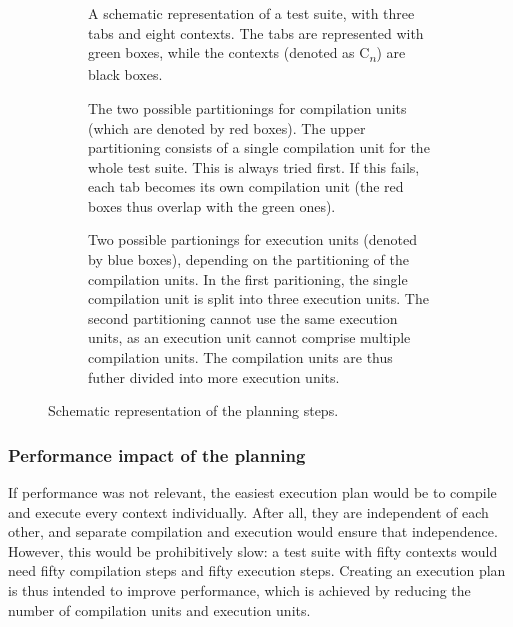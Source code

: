 \documentclass[../main]{subfiles}
\begin{document}
\begin{figure}
    \begin{subfigure}{\textwidth}
        \centering
        
        \caption{
            A schematic representation of a test suite, with three tabs and eight contexts.
            The tabs are represented with green boxes, while the contexts (denoted as C\textsubscript{$n$}) are black boxes.
        }
        \label{fig:planning-suite}
    \end{subfigure}
    \par\bigskip
    \begin{subfigure}{\textwidth}
        \centering
        
        \caption{
            The two possible partitionings for compilation units (which are denoted by red boxes).
            The upper partitioning consists of a single compilation unit for the whole test suite.
            This is always tried first.
            If this fails, each tab becomes its own compilation unit (the red boxes thus overlap with the green ones).
        }
        \label{fig:planning-compilation}
    \end{subfigure}
    \par\bigskip
    \begin{subfigure}{\textwidth}
        \centering
        
        \caption{
            Two possible partionings for execution units (denoted by blue boxes), depending on the partitioning of the compilation units.
            In the first paritioning, the single compilation unit is split into three execution units.
            The second partitioning cannot use the same execution units, as an execution unit cannot comprise multiple compilation units.
            The compilation units are thus futher divided into more execution units.
        }
        \label{fig:planning-execution}
    \end{subfigure}
    \caption{Schematic representation of the planning steps.}
\end{figure}

\subsubsection{Performance impact of the planning}

If performance was not relevant, the easiest execution plan would be to compile and execute every context individually.
After all, they are independent of each other, and separate compilation and execution would ensure that independence.
However, this would be prohibitively slow: a test suite with fifty contexts would need fifty compilation steps and fifty execution steps.
Creating an execution plan is thus intended to improve performance, which is achieved by reducing the number of compilation units and execution units.
\end{document}
